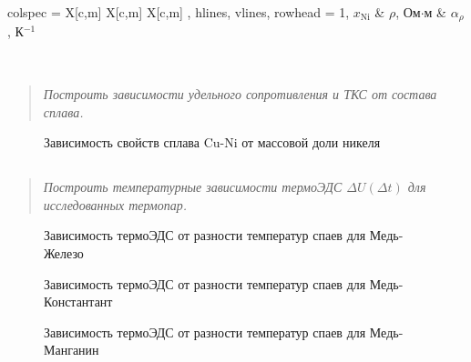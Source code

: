 \begin{longtblr}[
    caption = {Характеристики сплавов системы Cu-Ni},
    label = {tab:alloy},
    expand = \expanded,
]{
    colspec = { X[c,m] X[c,m] X[c,m] },
    hlines, vlines,
    rowhead = 1,
}
    $x_{\text{Ni}}$ & $\rho$, Ом$\cdot$м & $\alpha_\rho$, К$^{-1}$ \\
    \midrule
     \\
\end{longtblr}

\subsection*{  }
\begin{quote}
    \textit{Построить зависимости удельного сопротивления и ТКС от состава сплава.}
\end{quote}

\begin{figure}[H]
    \centering
    
    \caption{Зависимость свойств сплава Cu-Ni от массовой доли никеля}
    \label{fig:plot_alloy}
\end{figure}

\subsection*{  }
\begin{quote}
    \textit{Построить температурные зависимости термоЭДС $\Delta U(\Delta t)$ для исследованных термопар.}
\end{quote}

\begin{figure}[H]
    \centering
    
    \caption{Зависимость термоЭДС от разности температур спаев для Медь-Железо}
    \label{fig:plot_eds_CuFe}
\end{figure}
\begin{figure}[H]
    \centering
    
    \caption{Зависимость термоЭДС от разности температур спаев для Медь-Константант}
    \label{fig:plot_eds_CuConst}
\end{figure}
\begin{figure}[H]
    \centering
    
    \caption{Зависимость термоЭДС от разности температур спаев для Медь-Манганин}
    \label{fig:plot_eds_CuMang}
\end{figure}

